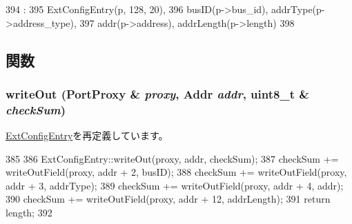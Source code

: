 \begin{DoxyCode}
394                                                           :
395     ExtConfigEntry(p, 128, 20),
396     busID(p->bus_id), addrType(p->address_type),
397     addr(p->address), addrLength(p->length)
398 {}

\end{DoxyCode}


\subsection{関数}
\hypertarget{classX86ISA_1_1IntelMP_1_1AddrSpaceMapping_a5fffc1006b1f28bd779d83ffbe213b4f}{
\subsubsection[{writeOut}]{ writeOut ({\bf PortProxy} \& {\em proxy}, \/  {\bf Addr} {\em addr}, \/  uint8\_\-t \& {\em checkSum})}}
\label{classX86ISA_1_1IntelMP_1_1AddrSpaceMapping_a5fffc1006b1f28bd779d83ffbe213b4f}


\hyperlink{classX86ISA_1_1IntelMP_1_1ExtConfigEntry_a5fffc1006b1f28bd779d83ffbe213b4f}{ExtConfigEntry}を再定義しています。


\begin{DoxyCode}
385 {
386     ExtConfigEntry::writeOut(proxy, addr, checkSum);
387     checkSum += writeOutField(proxy, addr + 2, busID);
388     checkSum += writeOutField(proxy, addr + 3, addrType);
389     checkSum += writeOutField(proxy, addr + 4, addr);
390     checkSum += writeOutField(proxy, addr + 12, addrLength);
391     return length;
392 }
\end{DoxyCode}


